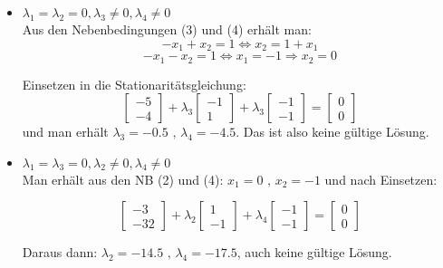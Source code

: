 \documentclass[a4paper, 12pt]{report}
\begin{document}
\begin{itemize}
  \item $\lambda_1 = \lambda_2 = 0, \lambda_3 \neq 0, \lambda_4 \neq 0$\\
  Aus den Nebenbedingungen (3) und (4) erhält man:\\
  $$ -x_1 + x_2 = 1 \Leftrightarrow x_2 = 1 + x_1$$
  $$ -x_1 - x_2 = 1 \Leftrightarrow x_1 = -1 \Rightarrow x_2 = 0$$

  Einsetzen in die Stationaritätsgleichung:
  $$\begin{bmatrix}-5\\-4\end{bmatrix} + \lambda_3 \begin{bmatrix}-1\\1\end{bmatrix} + \lambda_3 \begin{bmatrix}-1\\-1\end{bmatrix} = \begin{bmatrix}0\\0\end{bmatrix}$$
  und man erhält $\lambda_3 = -0.5 \text{ , } \lambda_4 = -4.5$. Das ist also keine gültige Lösung.

  \item $\lambda_1 = \lambda_3 = 0, \lambda_2 \neq 0, \lambda_4 \neq 0$\\
  Man erhält aus den NB (2) und (4): $x_1 = 0 \text{ , } x_2 = -1$ und nach Einsetzen:

  $$\begin{bmatrix}-3\\-32\end{bmatrix} + \lambda_2 \begin{bmatrix}1\\-1\end{bmatrix} + \lambda_4 \begin{bmatrix}-1\\-1\end{bmatrix} = \begin{bmatrix}0\\0\end{bmatrix}$$

  Daraus dann: $\lambda_2 = -14.5 \text{ , } \lambda_4 = -17.5$, auch keine gültige Lösung.
\end{itemize}
\end{document}
